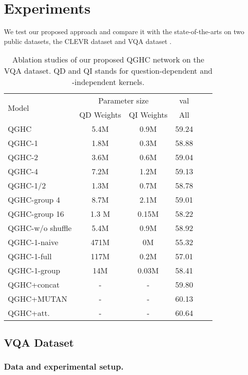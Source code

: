 \documentclass[runningheads]{llncs}
\begin{document}
\section{Experiments}

We test our proposed approach and compare it with the state-of-the-arts on two public datasets, the CLEVR dataset \cite{johnson2016clevr} and VQA dataset \cite{antol2015vqa}.

\begin{table}[tb]
\scriptsize
\centering
\begin{tabular}{l c c c c c}
\multirow{2}{*}{Model} &      \multicolumn{2}{c}{Parameter size} & \multicolumn{1}{c}{val} \\
\cmidrule(lr){2-3} \cmidrule(lr){4-4} 
 &  QD Weights & QI Weights  & All\\
\hline
QGHC &  5.4M  & 0.9M  & 59.24\\
\hline
QGHC-1 & 1.8M & 0.3M   & 58.88\\
QGHC-2 & 3.6M   & 0.6M   & 59.04\\
QGHC-4 & 7.2M  & 1.2M   & 59.13\\
QGHC-1/2 &  1.3M   & 0.7M    & 58.78\\
\hline
QGHC-group 4 & 8.7M  & 2.1M    & 59.01  \\
QGHC-group 16 & 1.3 M   & 0.15M    & 58.22  \\
QGHC-w/o shuffle & 5.4M & 0.9M  & 58.92  \\
\hline
QGHC-1-naive &  471M   &  0M    & 55.32 \\
QGHC-1-full &  117M  & 0.2M   & 57.01 \\
QGHC-1-group &  14M  & 0.03M     & 58.41 \\
\hline
QGHC+concat  &  - & -   & 59.80\\
QGHC+MUTAN  & - & -   & 60.13\\
QGHC+att. &  -  &  -   & 60.64 \\
\bottomrule
\end{tabular}
\caption{Ablation studies of our proposed QGHC network on the VQA dataset. QD and QI stands for question-dependent and -independent kernels.}
\label{tab:ablation}
\end{table}



\subsection{VQA Dataset}
\label{ssec:vqa}

\subsubsection{Data and experimental setup.}
\label{sssec:vqa_data}
\end{document}

